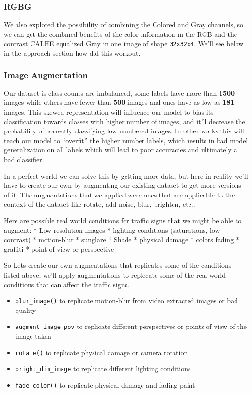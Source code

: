 \documentclass[11pt]{article}
\providecommand{\tightlist}{%
      \setlength{\itemsep}{0pt}\setlength{\parskip}{0pt}}
\begin{document}
    \hypertarget{rgbg}{%
\subsubsection{RGBG}\label{rgbg}}

We also explored the possibility of combining the Colored and Gray
channels, so we can get the combined benefits of the color information
in the {R}{G}{B} and the contrast CALHE equalized {Gray} in one image of
shape \texttt{32x32x4}. We'll see below in the approach section how did
this workout.

    \hypertarget{image-augmentation}{%
\subsubsection{Image Augmentation}\label{image-augmentation}}

Our dataset is class counts are imbalanced, some labels have more than
\textbf{1500} images while others have fewer than \textbf{500} images
and ones have as low as \textbf{181} images. This skewed representation
will influence our model to bias its classification towards classes with
higher number of images, and it'll decrease the probability of correctly
classifying low numbered images. In other works this will teach our
model to ``overfit'' the higher number labels, which results in bad
model generalization on all labels which will lead to poor accuracies
and ultimately a bad classifier.

In a perfect world we can solve this by getting more data, but here in
reality we'll have to create our own by augmenting our existing dataset
to get more versions of it. The augmentations that we applied were ones
that are applicable to the context of the dataset like rotate, add
noise, blur, brighten, etc..

Here are possible real world conditions for traffic signs that we might
be able to augment: * Low resolution images * lighting conditions
(saturations, low-contrast) * motion-blur * sunglare * Shade * physical
damage * colors fading * graffiti * point of view or perspective

So Lets create our own augmentations that replicates some of the
conditions listed above, we'll apply augmentations to replecate some of
the real world conditions that can affect the traffic signs.

\begin{itemize}
\tightlist
\item
  \texttt{blur\_image()} to replicate motion-blur from video extracted
  images or bad quality
\item
  \texttt{augment\_image\_pov} to replicate different perspectives or
  points of view of the image taken
\item
  \texttt{rotate()} to replicate physical damage or camera rotation
\item
  \texttt{bright\_dim\_image} to replicate different lighting conditions
\item
  \texttt{fade\_color()} to replicate physical damage and fading paint
\end{itemize}
\end{document}
